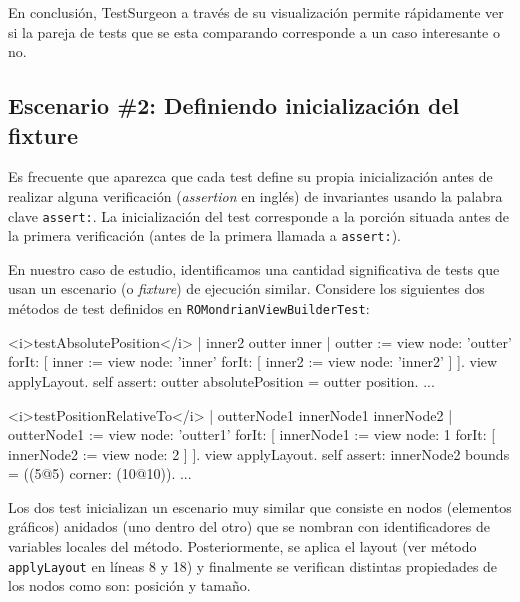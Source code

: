
\par En conclusión, TestSurgeon a través de su visualización permite rápidamente ver si la pareja de tests que se esta comparando corresponde a un caso interesante o no.

\subsection{Escenario \#2: Definiendo inicialización del fixture}

\par Es frecuente que aparezca que cada test define su propia inicialización antes de realizar alguna verificación (\emph{assertion} en inglés) de invariantes usando la palabra clave {\tt assert:}. La inicialización del test corresponde a la porción situada antes de la primera verificación (\ie antes de la primera llamada a {\tt assert:}).

\par En nuestro caso de estudio, identificamos una cantidad significativa de tests que usan un escenario (o \emph{fixture}) de ejecución similar. Considere los siguientes dos métodos de test definidos en {\tt ROMondrianViewBuilderTest}:

\begin{codeWithLineNumbers}
<i>testAbsolutePosition</i>
	| inner2 outter inner |
	outter := view node: 'outter' forIt: [
		inner := view node: 'inner' forIt: [
			inner2 := view node: 'inner2'
		]
	].
	view applyLayout.
	self assert: outter absolutePosition = outter position.
	...


<i>testPositionRelativeTo</i>
	| outterNode1 innerNode1 innerNode2 |
	outterNode1 := view node: 'outter1' forIt: 
		[ innerNode1 := view node: 1 forIt: [ 
		innerNode2 := view node: 2 ] ].
	view applyLayout.
	self assert: innerNode2 bounds = ((5@5) corner: (10@10)).
	...
\end{codeWithLineNumbers}

\par Los dos test inicializan un escenario muy similar que consiste en nodos (elementos gráficos) anidados (uno dentro del otro) que se nombran con identificadores de variables locales del método. Posteriormente, se aplica el layout (ver método {\tt applyLayout} en líneas 8 y 18) y finalmente se verifican distintas propiedades de los nodos como son: posición y tamaño.

